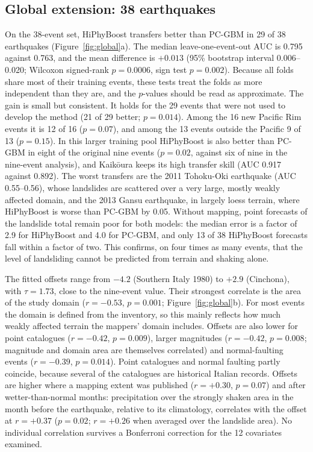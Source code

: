 \subsection{Global extension: 38 earthquakes}\label{sec:res_global}
On the 38-event set, HiPhyBoost transfers better than PC-GBM in 29 of 38 earthquakes (Figure~\ref{fig:global}a). The median leave-one-event-out AUC is 0.795 against 0.763, and the mean difference is $+0.013$ (95\% bootstrap interval 0.006--0.020; Wilcoxon signed-rank $p=0.0006$, sign test $p=0.002$). Because all folds share most of their training events, these tests treat the folds as more independent than they are, and the $p$-values should be read as approximate. The gain is small but consistent. It holds for the 29 events that were not used to develop the method (21 of 29 better; $p=0.014$). Among the 16 new Pacific Rim events it is 12 of 16 ($p=0.07$), and among the 13 events outside the Pacific 9 of 13 ($p=0.15$). In this larger training pool HiPhyBoost is also better than PC-GBM in eight of the original nine events ($p=0.02$, against six of nine in the nine-event analysis), and Kaik\={o}ura keeps its high transfer skill (AUC 0.917 against 0.892). The worst transfers are the 2011 Tohoku-Oki earthquake (AUC 0.55--0.56), whose landslides are scattered over a very large, mostly weakly affected domain, and the 2013 Gansu earthquake, in largely loess terrain, where HiPhyBoost is worse than PC-GBM by 0.05. Without mapping, point forecasts of the landslide total remain poor for both models: the median error is a factor of 2.9 for HiPhyBoost and 4.0 for PC-GBM, and only 13 of 38 HiPhyBoost forecasts fall within a factor of two. This confirms, on four times as many events, that the level of landsliding cannot be predicted from terrain and shaking alone.

The fitted offsets range from $-4.2$ (Southern Italy 1980) to $+2.9$ (Cinchona), with $\tau=1.73$, close to the nine-event value. Their strongest correlate is the area of the study domain ($r=-0.53$, $p=0.001$; Figure~\ref{fig:global}b). For most events the domain is defined from the inventory, so this mainly reflects how much weakly affected terrain the mappers' domain includes. Offsets are also lower for point catalogues ($r=-0.42$, $p=0.009$), larger magnitudes ($r=-0.42$, $p=0.008$; magnitude and domain area are themselves correlated) and normal-faulting events ($r=-0.39$, $p=0.014$). Point catalogues and normal faulting partly coincide, because several of the catalogues are historical Italian records. Offsets are higher where a mapping extent was published ($r=+0.30$, $p=0.07$) and after wetter-than-normal months: precipitation over the strongly shaken area in the month before the earthquake, relative to its climatology, correlates with the offset at $r=+0.37$ ($p=0.02$; $r=+0.26$ when averaged over the landslide area). No individual correlation survives a Bonferroni correction for the 12 covariates examined.

